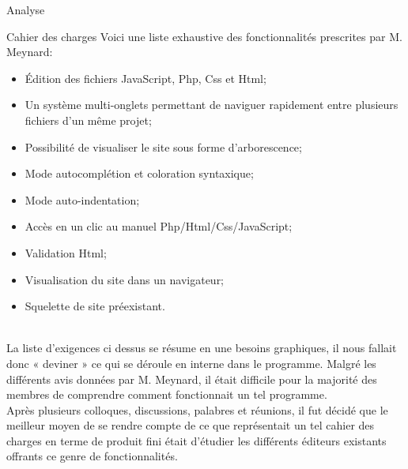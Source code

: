 \documentclass[a4paper, 12pt]{report}
\begin{document}
	\begin{part}{Analyse}
		\begin{chapter}{Cahier des charges}
			Voici une liste exhaustive des fonctionnalités prescrites par M. Meynard:
			\begin{itemize}
				\item Édition des fichiers JavaScript, Php, Css et Html;
				\item Un système multi-onglets permettant de naviguer rapidement entre plusieurs fichiers d'un même projet;
				\item Possibilité de visualiser le site sous forme d'arborescence;
				\item Mode \gls{autocomplétion} et coloration syntaxique;
				\item Mode auto-indentation;
				\item Accès en un clic au manuel Php/Html/Css/JavaScript;
				\item Validation Html;
				\item Visualisation du site dans un navigateur;
				\item Squelette de site préexistant.
			\end{itemize}~\\

			La liste d'exigences ci dessus se résume en une besoins graphiques, il nous fallait donc « deviner » ce qui se déroule en interne 
			dans le programme. Malgré les différents avis données par M. Meynard, il était difficile pour la majorité des membres de
			comprendre comment fonctionnait un tel programme.\\

			Après plusieurs colloques, discussions, palabres et réunions, il fut décidé que le meilleur moyen de se rendre compte de ce que
			représentait un tel cahier des charges en terme de produit fini était d'étudier les différents éditeurs existants offrants ce 
			genre de fonctionnalités.
		\end{chapter}


\end{part}
\end{document}
